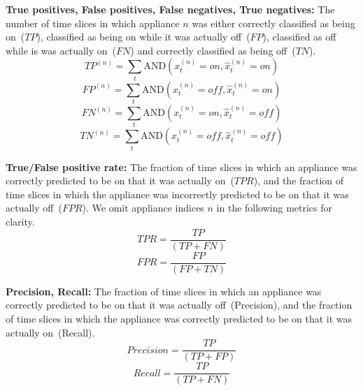 \documentclass{sig-alternate}
\begin{document}
\textbf{True positives, False positives, False negatives, True negatives:} The number of time slices in which appliance $n$ was either correctly classified as being on~($\mathit{TP}$), classified as being on while it was actually off~($\mathit{FP}$), classified as off while is was actually on~($\mathit{FN}$) and correctly classified as being off~($\mathit{TN}$).
\begin{equation}
\mathit{TP}^{(n)} = 
\sum_{t}
\mathrm{AND} \left ( x^{(n)}_t = \mathit{on}, \hat{x}^{(n)}_t = \mathit{on} \right )
\end{equation}
\begin{equation}
\mathit{FP}^{(n)} = 
\sum_{t}
\mathrm{AND} \left ( x^{(n)}_t = \mathit{off}, \hat{x}^{(n)}_t = \mathit{on} \right )
\end{equation}
\begin{equation}
\mathit{FN}^{(n)} = 
\sum_{t}
\mathrm{AND} \left ( x^{(n)}_t = \mathit{on}, \hat{x}^{(n)}_t = \mathit{off} \right )
\end{equation}
\begin{equation}
\mathit{TN}^{(n)} = 
\sum_{t}
\mathrm{AND} \left ( x^{(n)}_t = \mathit{off}, \hat{x}^{(n)}_t = \mathit{off} \right )
\end{equation}

\textbf{True/False positive rate:} The fraction of time slices in which an appliance was correctly predicted to be on that it was actually on~($\mathit{TPR}$), and the fraction of time slices in which the appliance was incorrectly predicted to be on that it was actually off~($\mathit{FPR}$). We omit appliance indices $n$ in the following metrics for clarity.
\begin{equation}
\mathit{TPR} = \frac{\mathit{TP}}{\left ( \mathit{TP} + \mathit{FN} \right )}
\end{equation}
\begin{equation}
\mathit{FPR} = \frac{\mathit{FP}}{\left ( \mathit{FP} + \mathit{TN} \right )}
\end{equation}

\textbf{Precision, Recall:} The fraction of time slices in which an appliance was correctly predicted to be on that it was actually off~(Precision), and the fraction of time slices in which the appliance was correctly predicted to be on that it was actually on~(Recall).
\begin{equation}
\mathit{Precision} = \frac{\mathit{TP}}{\left ( \mathit{TP} + \mathit{FP} \right )}
\end{equation}
\begin{equation}
\mathit{Recall} = \frac{\mathit{TP}}{\left ( \mathit{TP} + \mathit{FN} \right )}
\end{equation}
\end{document}
